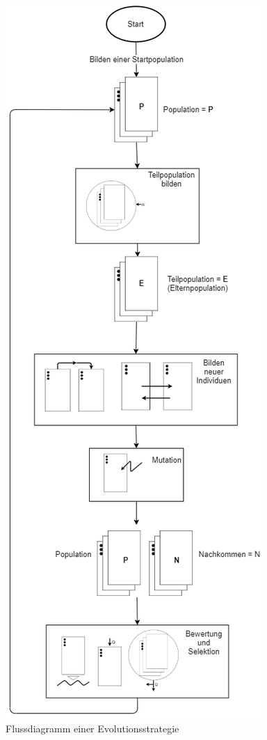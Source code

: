 \begin{figure}[!htb]
	\centering
	\includegraphics[height=\textheight, keepaspectratio]{img/typisches_aussehen/es_grafik.png}
	\caption{Flussdiagramm einer Evolutionsstrategie}
	\label{fig:flowchart_es}
\end{figure}



